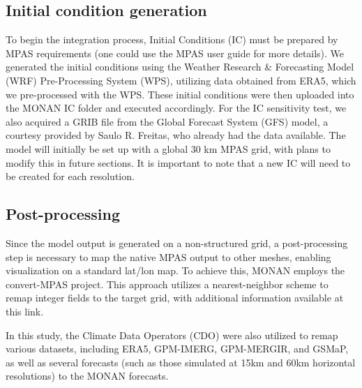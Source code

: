 \subsection{Initial condition generation}

To begin the integration process, Initial Conditions (IC) must be prepared by MPAS requirements (one could use the MPAS user guide for more details). We generated the initial conditions using the Weather Research \& Forecasting Model (WRF) Pre-Processing System (WPS), utilizing data obtained from ERA5, which we pre-processed with the WPS. These initial conditions were then uploaded into the MONAN IC folder and executed accordingly. For the IC sensitivity test, we also acquired a GRIB file from the Global Forecast System (GFS) model, a courtesy provided by Saulo R. Freitas, who already had the data available. The model will initially be set up with a global 30 km MPAS grid, with plans to modify this in future sections. It is important to note that a new IC will need to be created for each resolution.

\subsection{Post-processing}

Since the model output is generated on a non-structured grid, a post-processing step is necessary to map the native MPAS output to other meshes, enabling visualization on a standard lat/lon map. To achieve this, MONAN employs the convert-MPAS project. This approach utilizes a nearest-neighbor scheme to remap integer fields to the target grid, with additional information available at this link.

In this study, the Climate Data Operators (CDO) were also utilized to remap various datasets, including ERA5, GPM-IMERG, GPM-MERGIR, and GSMaP, as well as several forecasts (such as those simulated at 15km and 60km horizontal resolutions) to the MONAN forecasts.
